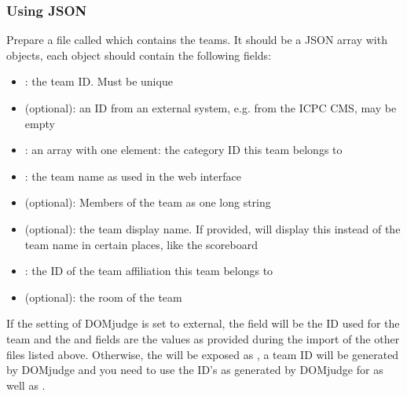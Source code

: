 \documentclass[a4paper,10pt,english,openany]{sphinxmanual}
\begin{document}
\subsubsection{Using JSON}
\label{\detokenize{import:id1}}
\sphinxAtStartPar
Prepare a file called  which contains the teams.
It should be a JSON array with objects, each object should contain the following
fields:
\begin{itemize}
\item {} 
\sphinxAtStartPar
{}: the team ID. Must be unique

\item {} 
\sphinxAtStartPar
{} (optional): an ID from an external system, e.g. from the ICPC CMS, may be empty

\item {} 
\sphinxAtStartPar
{}: an array with one element: the category ID this team belongs to

\item {} 
\sphinxAtStartPar
{}: the team name as used in the web interface

\item {} 
\sphinxAtStartPar
{} (optional): Members of the team as one long string

\item {} 
\sphinxAtStartPar
{} (optional): the team display name. If provided, will display
this instead of the team name in certain places, like the scoreboard

\item {} 
\sphinxAtStartPar
{}: the ID of the team affiliation this team belongs to

\item {} 
\sphinxAtStartPar
{} (optional): the room of the team

\end{itemize}

\sphinxAtStartPar
If the  setting of DOMjudge is set to external, the  field will be the
ID used for the team and the  and  fields are the values as
provided during the import of the other files listed above. Otherwise, the  will be
exposed as , a team ID will be generated by DOMjudge and you need to use the
ID’s as generated by DOMjudge for  as well as .
\end{document}
